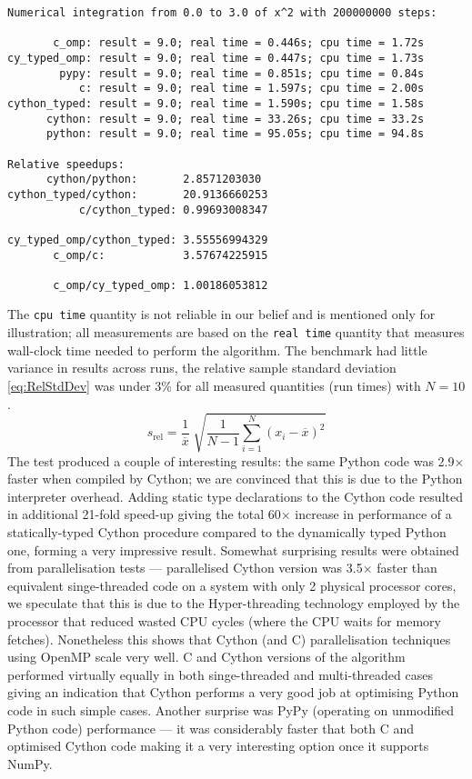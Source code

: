 \begin{Verbatim}[label=typical benchmark run,frame=single]
Numerical integration from 0.0 to 3.0 of x^2 with 200000000 steps:

       c_omp: result = 9.0; real time = 0.446s; cpu time = 1.72s
cy_typed_omp: result = 9.0; real time = 0.447s; cpu time = 1.73s
        pypy: result = 9.0; real time = 0.851s; cpu time = 0.84s
           c: result = 9.0; real time = 1.597s; cpu time = 2.00s
cython_typed: result = 9.0; real time = 1.590s; cpu time = 1.58s
      cython: result = 9.0; real time = 33.26s; cpu time = 33.2s
      python: result = 9.0; real time = 95.05s; cpu time = 94.8s

Relative speedups:
      cython/python:       2.8571203030
cython_typed/cython:       20.9136660253
           c/cython_typed: 0.99693008347

cy_typed_omp/cython_typed: 3.55556994329
       c_omp/c:            3.57674225915

       c_omp/cy_typed_omp: 1.00186053812
\end{Verbatim}
The \verb|cpu time| quantity is not reliable in our belief and is mentioned only for illustration;
all measurements are based on the \verb|real time| quantity that measures wall-clock time needed to
perform the algorithm.
The benchmark had little variance in results across runs, the relative sample standard deviation
\eqref{eq:RelStdDev} was under 3\% for all measured quantities (run times) with \(N = 10\).
\begin{equation} \label{eq:RelStdDev}
	s_{\text{rel}} = \frac{1}{\overline{x}} \; \sqrt{\frac{1}{N-1} \sum_{i=1}^N (x_i - \overline{x})^2}
\end{equation}
The test produced a couple of interesting results: the same Python code was 2.9\(\times\) faster
when compiled by Cython; we are convinced that this is due to the Python interpreter overhead. Adding
static type declarations to the Cython code resulted in additional 21-fold speed-up giving the total
60\(\times\) increase in performance of a statically-typed Cython procedure compared to the dynamically
typed Python one, forming a very impressive result. Somewhat surprising results were obtained from
parallelisation tests --- parallelised Cython version was 3.5\(\times\) faster than equivalent
singe-threaded code on a system with only 2 physical processor cores, we speculate that this is due
to the Hyper-threading technology employed by the processor that reduced wasted CPU cycles (where
the CPU waits for memory fetches). Nonetheless this shows that Cython (and C) parallelisation techniques
using OpenMP scale very well. C and Cython versions of the algorithm performed virtually equally
in both singe-threaded and multi-threaded cases giving an indication that Cython performs a very good
job at optimising Python code in such simple cases. Another surprise was PyPy (operating on
unmodified Python code) performance --- it was considerably faster that both C and optimised Cython
code making it a very interesting option once it supports NumPy.

